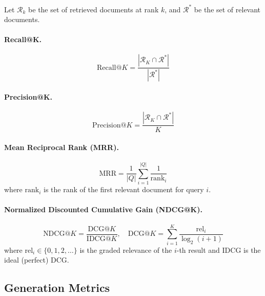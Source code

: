 Let $\mathcal{R}_k$ be the set of retrieved documents at rank $k$, and $\mathcal{R}^*$ be the set of relevant documents.

\paragraph{Recall@K.}
\label{recallk.}

\begin{equation}
  \text{Recall@}K = \frac{|\mathcal{R}_K \cap \mathcal{R}^*|}{|\mathcal{R}^*|}
\end{equation}

\paragraph{Precision@K.}
\label{precisionk.}

\begin{equation}
  \text{Precision@}K = \frac{|\mathcal{R}_K \cap \mathcal{R}^*|}{K}
\end{equation}

\paragraph{Mean Reciprocal Rank (MRR).}
\label{mean-reciprocal-rank-mrr.}

\begin{equation}
  \text{MRR} = \frac{1}{|Q|} \sum_{i=1}^{|Q|} \frac{1}{\text{rank}_i}
\end{equation}
 where $\text{rank}_i$ is the rank of the first relevant document for query $i$.

\paragraph{Normalized Discounted Cumulative Gain (NDCG@K).}
\label{normalized-discounted-cumulative-gain-ndcgk.}

\begin{equation}
  \text{NDCG@}K = \frac{\text{DCG@}K}{\text{IDCG@}K}, \quad
  \text{DCG@}K = \sum_{i=1}^{K} \frac{\text{rel}_i}{\log_2(i+1)}
\end{equation}
 where $\text{rel}_i \in \{0, 1, 2, \ldots\}$ is the graded relevance of the $i$-th result and IDCG is the ideal (perfect) DCG.

\subsection{Generation Metrics}
\label{generation-metrics}

